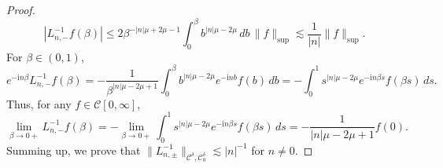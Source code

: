 \documentclass[10pt,a4paper]{amsart}
\newcommand{\mcal}{\mathcal}
\newcommand{\norm}[1]{\lVert #1 \rVert}
\begin{document}
\begin{proof}
\[|L_{n,-}^{-1} f(\beta)| \leq 2\beta^{-|n|\mu + 2\mu - 1} \int_0^\beta b^{|n|\mu - 2\mu} \,db \, \norm{f}_{\sup} \lesssim \frac{1}{|n|} \norm{f}_{\sup}.\]
For $\beta \in (0,1)$,
\[e^{-\textrm{i}n\beta} L_{n,-}^{-1} f(\beta) = - \frac{1}{\beta^{|n|\mu - 2\mu + 1}} \int_0^\beta b^{|n|\mu - 2\mu} e^{-\textrm{i}n b} f(b) \,db = - \int_0^1 s^{|n|\mu - 2\mu} e^{-\textrm{i}n\beta s} f(\beta s) \,ds.\]
Thus, for any $f\in\mcal{C}[0,\infty]$,
\[\lim_{\beta \to 0+} L_{n,-}^{-1} f(\beta) = - \lim_{\beta \to 0+} \int_0^1 s^{|n|\mu - 2\mu} e^{-\textrm{i}n\beta s} f(\beta s) \,ds = - \frac{1}{|n|\mu - 2\mu + 1} f(0).\]
Summing up, we prove that $\norm{L_{n,\pm}^{-1}}_{\mcal{C}^\delta, \mcal{C}^\delta_0} \lesssim |n|^{-1}$ for $n\neq 0$.
\end{proof}
\end{document}
